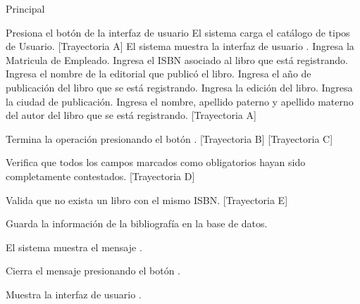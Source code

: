 \begin{UCtrayectoria}{Principal}

    \UCpaso[\UCactor] Presiona el botón  de la interfaz de usuario 
    \UCpaso El sistema carga el catálogo de tipos de Usuario. [Trayectoria A]
    \UCpaso El sistema muestra la interfaz de usuario .
    \UCpaso[\UCactor] Ingresa la Matricula de Empleado.
    \UCpaso[\UCactor] Ingresa el ISBN asociado al libro que está registrando.
    \UCpaso[\UCactor] Ingresa el nombre de la editorial que publicó el libro.
    \UCpaso[\UCactor] Ingresa el año de publicación del libro que se está registrando.
    \UCpaso[\UCactor] Ingresa la edición del libro.
    \UCpaso[\UCactor] Ingresa la ciudad de publicación.
    \UCpaso[\UCactor] Ingresa el nombre, apellido paterno y apellido materno  del autor del libro que se está registrando. [Trayectoria A]


    \UCpaso[\UCactor] Termina la operación presionando el botón . [Trayectoria B] [Trayectoria C]

    \UCpaso Verifica que todos los campos marcados como obligatorios hayan sido completamente contestados. [Trayectoria D]

    \UCpaso Valida que no exista un libro con el mismo ISBN. [Trayectoria E]

    \UCpaso Guarda la información de la bibliografía en la base de datos.

    \UCpaso El sistema muestra el mensaje .

    \UCpaso[\UCactor] Cierra el mensaje presionando el botón .

    \UCpaso Muestra la interfaz de usuario .
\end{UCtrayectoria}


\begin{comment}
\begin{UCtrayectoriaA}{A}{El sistema no encuentra ningún formulario para mostrar.}
    \UCpaso No encuentra ningún formulario para mostrar.
    \UCpaso El sistema muestra el mensaje \MSGref{MSG6}{Por el momento no se puede registrar la bibliografía}.
    \UCpaso[\UCactor] Cierra el mensaje presionando el botón \IUbutton{Aceptar}.
    \UCpaso Continua en el paso 1 de la trayectoria principal del \UCref{CU1}.
\end{UCtrayectoriaA}
\end{comment}

